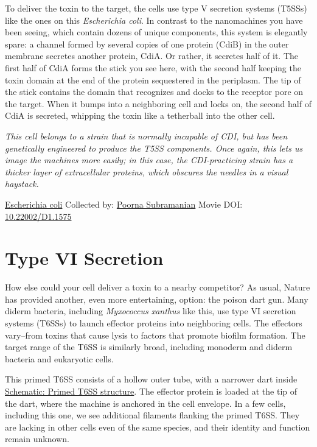 \documentclass[]{tufte-book}
\begin{document}
To deliver the toxin to the target, the cells use type V secretion systems (T5SSs) like the ones on this \emph{Escherichia coli}. In contrast to the nanomachines you have been seeing, which contain dozens of unique components, this system is elegantly spare: a channel formed by several copies of one protein (CdiB) in the outer membrane secretes another protein, CdiA. Or rather, it secretes half of it. The first half of CdiA forms the stick you see here, with the second half keeping the toxin domain at the end of the protein sequestered in the periplasm. The tip of the stick contains the domain that recognizes and docks to the receptor pore on the target. When it bumps into a neighboring cell and locks on, the second half of CdiA is secreted, whipping the toxin like a tetherball into the other cell.

\emph{This cell belongs to a strain that is normally incapable of CDI, but has been genetically engineered to produce the T5SS components. Once again, this lets us image the machines more easily; in this case, the CDI-practicing strain has a thicker layer of extracellular proteins, which obscures the needles in a visual haystack.}



\hypertarget{htmlwidget-92c74171de954a689fbc}{}

\label{fig:9-5}\protect\hyperlink{tree}{Escherichia coli} Collected by: \protect\hyperlink{poorna_subramanian}{Poorna Subramanian} Movie DOI: \href{https://doi.org/10.22002/D1.1575}{10.22002/D1.1575}

\hypertarget{type-vi-secretion}{%
\section{Type VI Secretion}\label{type-vi-secretion}}

How else could your cell deliver a toxin to a nearby competitor? As usual, Nature has provided another, even more entertaining, option: the poison dart gun. Many diderm bacteria, including \emph{Myxococcus xanthus} like this, use type VI secretion systems (T6SSs) to launch effector proteins into neighboring cells. The effectors vary--from toxins that cause lysis to factors that promote biofilm formation. The target range of the T6SS is similarly broad, including monoderm and diderm bacteria and eukaryotic cells.

This primed T6SS consists of a hollow outer tube, with a narrower dart inside \protect\hyperlink{Primed_T6SS_structure}{Schematic: Primed T6SS structure}. The effector protein is loaded at the tip of the dart, where the machine is anchored in the cell envelope. In a few cells, including this one, we see additional filaments flanking the primed T6SS. They are lacking in other cells even of the same species, and their identity and function remain unknown.
\end{document}
